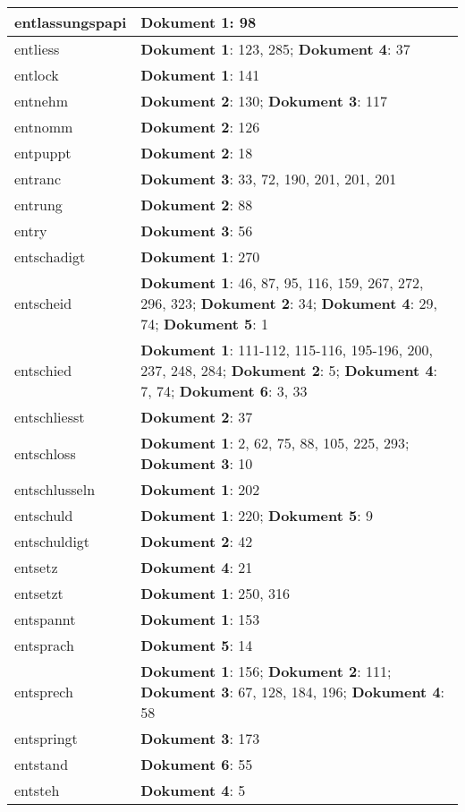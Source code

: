 \documentclass[a5paper]{article}
\begin{document}
\begin{longtable}[l]{|l|p{3in}|}
\hline
entlassungspapi & \textbf{Dokument 1}: 98 \\
\hline
entliess & \textbf{Dokument 1}: 123, 285; \textbf{Dokument 4}: 37 \\
\hline
entlock & \textbf{Dokument 1}: 141 \\
\hline
entnehm & \textbf{Dokument 2}: 130; \textbf{Dokument 3}: 117 \\
\hline
entnomm & \textbf{Dokument 2}: 126 \\
\hline
entpuppt & \textbf{Dokument 2}: 18 \\
\hline
entranc & \textbf{Dokument 3}: 33, 72, 190, 201, 201, 201 \\
\hline
entrung & \textbf{Dokument 2}: 88 \\
\hline
entry & \textbf{Dokument 3}: 56 \\
\hline
entschadigt & \textbf{Dokument 1}: 270 \\
\hline
entscheid & \textbf{Dokument 1}: 46, 87, 95, 116, 159, 267, 272, 296, 323; \textbf{Dokument 2}: 34; \textbf{Dokument 4}: 29, 74; \textbf{Dokument 5}: 1 \\
\hline
entschied & \textbf{Dokument 1}: 111-112, 115-116, 195-196, 200, 237, 248, 284; \textbf{Dokument 2}: 5; \textbf{Dokument 4}: 7, 74; \textbf{Dokument 6}: 3, 33 \\
\hline
entschliesst & \textbf{Dokument 2}: 37 \\
\hline
entschloss & \textbf{Dokument 1}: 2, 62, 75, 88, 105, 225, 293; \textbf{Dokument 3}: 10 \\
\hline
entschlusseln & \textbf{Dokument 1}: 202 \\
\hline
entschuld & \textbf{Dokument 1}: 220; \textbf{Dokument 5}: 9 \\
\hline
entschuldigt & \textbf{Dokument 2}: 42 \\
\hline
entsetz & \textbf{Dokument 4}: 21 \\
\hline
entsetzt & \textbf{Dokument 1}: 250, 316 \\
\hline
entspannt & \textbf{Dokument 1}: 153 \\
\hline
entsprach & \textbf{Dokument 5}: 14 \\
\hline
entsprech & \textbf{Dokument 1}: 156; \textbf{Dokument 2}: 111; \textbf{Dokument 3}: 67, 128, 184, 196; \textbf{Dokument 4}: 58 \\
\hline
entspringt & \textbf{Dokument 3}: 173 \\
\hline
entstand & \textbf{Dokument 6}: 55 \\
\hline
entsteh & \textbf{Dokument 4}: 5 \\

\end{longtable}
\end{document}
